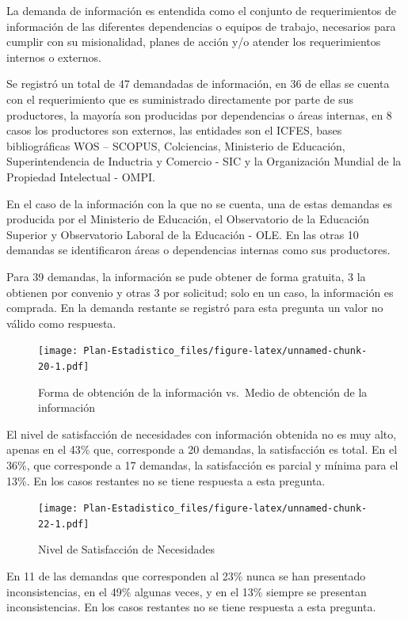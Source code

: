 \documentclass[
]{book}
\begin{document}
La demanda de información es entendida como el conjunto de requerimientos de información de
las diferentes dependencias o equipos de trabajo, necesarios para cumplir con su misionalidad,
planes de acción y/o atender los requerimientos internos o externos.

Se registró un total de 47 demandadas de información, en 36 de ellas se cuenta con el
requerimiento que es suministrado directamente por parte de sus productores, la mayoría son
producidas por dependencias o áreas internas, en 8 casos los productores son externos, las entidades son el ICFES, bases bibliográficas WOS -- SCOPUS, Colciencias, Ministerio de Educación,
Superintendencia de Inductria y Comercio - SIC y la Organización Mundial de la Propiedad Intelectual - OMPI.

En el caso de la información con la que no se cuenta, una de estas demandas es producida por el
Ministerio de Educación, el Observatorio de la Educación Superior y Observatorio Laboral de la Educación - OLE. En las otras 10 demandas
se identificaron áreas o dependencias internas como sus productores.

Para 39 demandas, la información se pude obtener de forma gratuita, 3 la obtienen por convenio y
otras 3 por solicitud; solo en un caso, la información es comprada. En la demanda restante se
registró para esta pregunta un valor no válido como respuesta.

\begin{figure}
\centering
\texttt{[image: Plan-Estadistico\_files/figure-latex/unnamed-chunk-20-1.pdf]}
\caption{\label{fig:unnamed-chunk-20}Forma de obtención de la información vs.~Medio de obtención de la información}
\end{figure}

El nivel de satisfacción de necesidades con información obtenida no es muy alto, apenas en el 43\% que, corresponde a 20 demandas, la satisfacción es total. En el 36\%, que corresponde a 17 demandas, la satisfacción es parcial y mínima para el 13\%. En los casos restantes no se tiene respuesta a esta pregunta.

\begin{figure}
\centering
\texttt{[image: Plan-Estadistico\_files/figure-latex/unnamed-chunk-22-1.pdf]}
\caption{\label{fig:unnamed-chunk-22}Nivel de Satisfacción de Necesidades}
\end{figure}

En 11 de las demandas que corresponden al 23\% nunca se han presentado inconsistencias, en el
49\% algunas veces, y en el 13\% siempre se presentan inconsistencias. En los casos restantes no se
tiene respuesta a esta pregunta.
\end{document}
